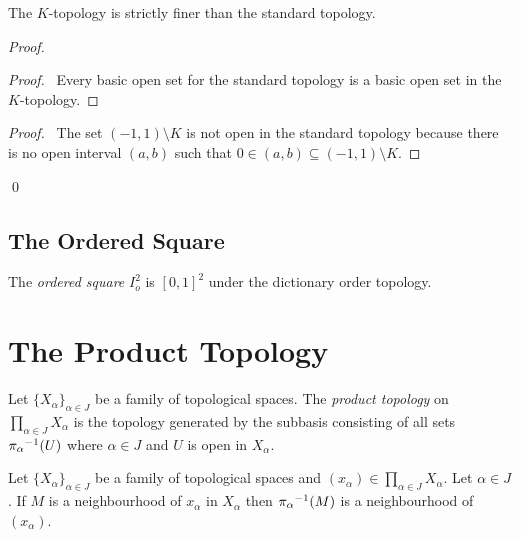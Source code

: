 \begin{prop}
  The $K$-topology is strictly finer than the standard topology.
\end{prop}

\begin{proof}
  \pf
  \begin{proof}
    \pf\ Every basic open set for the standard topology is a basic open set in the $K$-topology.
  \end{proof}
  \begin{proof}
    \pf\ The set $(-1,1) \setminus K$ is not open in the standard topology because there is no open interval $(a,b)$ such that $0 \in (a,b) \subseteq (-1,1) \setminus K$.
  \end{proof}
  \qed
\end{proof}

\subsection{The Ordered Square}

\begin{df}
  The \emph{ordered square} $I_o^2$ is $[0,1]^2$ under the dictionary order topology.
\end{df}

\section{The Product Topology}

\begin{df}
  Let $\{ X_\alpha \}_{\alpha \in J}$ be a family of topological spaces. The \emph{product topology} on $\prod_{\alpha \in J} X_\alpha$ is the topology generated by the subbasis consisting of all sets ${\pi_\alpha}^{-1}(U)$ where $\alpha \in J$ and $U$ is open in $X_\alpha$.
\end{df}

\begin{prop}
  \label{prop:product:neighbourhood}
  Let $\{ X_\alpha \}_{\alpha \in J}$ be a family of topological spaces and $(x_\alpha) \in \prod_{\alpha \in J} X_\alpha$. Let $\alpha \in J$. If $M$ is a neighbourhood of $x_\alpha$ in $X_\alpha$ then ${\pi_\alpha}^{-1}(M)$ is a neighbourhood of $(x_\alpha)$.
\end{prop}

